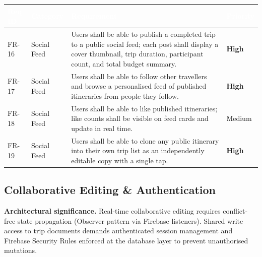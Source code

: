 \documentclass[12pt, a4paper]{article}
\newcommand{\reqid}[1]{\textsc{\small #1}}
\newcommand{\high}{\textbf{High}}
\newcommand{\medium}{Medium}
\newcommand{\thcell}[1]{\textcolor{white}{\textbf{\small #1}}}
\begin{document}
\vspace{0.4em}
\begin{longtable}{C{1.6cm} C{2.0cm} L{8.2cm} C{1.8cm}}
\toprule
{}
\thcell{Req ID} & \thcell{Category} & \thcell{Requirement} & \thcell{Priority} \\
\midrule
\endhead
\bottomrule
\endfoot

\reqid{FR-16} & Social Feed &
Users shall be able to publish a completed trip to a public social feed; each post shall display a cover thumbnail, trip duration, participant count, and total budget summary. &
\high \\

\reqid{FR-17} & Social Feed &
Users shall be able to follow other travellers and browse a personalised feed of published itineraries from people they follow. &
\high \\

\reqid{FR-18} & Social Feed &
Users shall be able to like published itineraries; like counts shall be visible on feed cards and update in real time. &
\medium \\

\reqid{FR-19} & Social Feed &
Users shall be able to clone any public itinerary into their own trip list as an independently editable copy with a single tap. &
\high \\

\end{longtable}

\subsection{Collaborative Editing \& Authentication}

\begin{tcolorbox}[notebox]
  \textbf{Architectural significance.} Real-time collaborative editing requires conflict-free state propagation (Observer pattern via Firebase listeners). Shared write access to trip documents demands authenticated session management and Firebase Security Rules enforced at the database layer to prevent unauthorised mutations.
\end{tcolorbox}
\end{document}
